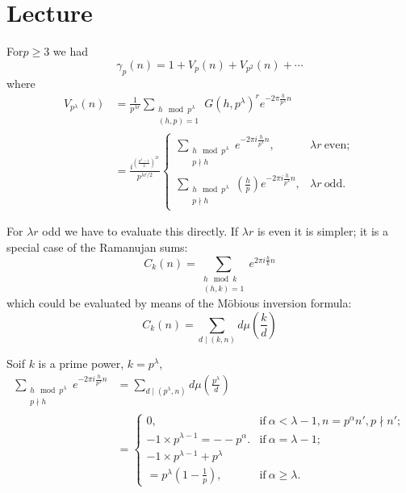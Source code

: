 \chapter{Lecture}\label{part4:lec39} %

For\pageoriginale $p \geq 3$ we had 
$$
\gamma_p (n)= 1+ V_p (n) + V_{p^2} (n) + \cdots
$$ 
where
\begin{align*}
  V_{p^\lambda} (n) & = \frac{1}{p^{\lambda r}} \sum_{\substack{h \mod
  p^\lambda\\(h, p)=1}} G(h, p^\lambda)^r e^{-2 \pi
    \frac{h}{p^\lambda}n}\\
  & = \frac{i^{\left( \frac{p^\lambda -1}{2}\right)^{2r}}}{p^{\lambda
      r/2}} 
  \begin{cases}
    \sum\limits_{\substack{h \mod p^\lambda\\p \nmid h}} e^{- 2 \pi i
      \frac{h}{p^\lambda}n}, & \lambda r ~\text{even};\\
    \sum\limits_{\substack{h \mod p^\lambda\\p \nmid h}}
    \left(\frac{h}{p}\right) e^{-2 \pi i \frac{h}{p^\lambda}n}, &
    \lambda r ~\text{odd}.
  \end{cases}
\end{align*}

For $\lambda r$ odd we have to evaluate this directly. If $\lambda r$
is even it is simpler; it is a special case of the Ramanujan sums:
$$
C_k (n) = \sum_{\substack{h \mod k\\(h, k)=1}} e^{2 \pi i \frac{h}{k}n}
$$
which could be evaluated by means of the M\"obious inversion formula:
$$
C_k (n) = \sum_{d\mid (k, n)} d \mu \left(\frac{k}{d}\right)
$$

So\pageoriginale if $k$ is a prime power, $k= p^\lambda$,
\begin{align*}
  \sum_{\substack{h \mod p^\lambda\\ p \nmid h}} e^{- 2 \pi i
    \frac{h}{p^\lambda} n}& = \sum_{d\mid(p^\lambda, n)} d \mu
  \left(\frac{p^\lambda}{d}\right) \\
  & = 
  \begin{cases}
    0 , & \text{if}~ \alpha < \lambda -1, n= p^\alpha n', p \nmid
    n';\\
    -1 \times p^{\lambda -1} = - - p^\alpha. & \text{if}~ \alpha =
    \lambda -1;\\
    -1 \times p^{\lambda -1} + p^\lambda\\
    = p^\lambda (1- \frac{1}{p}), & \text{if}~ \alpha \geq \lambda.
  \end{cases}
\end{align*}


